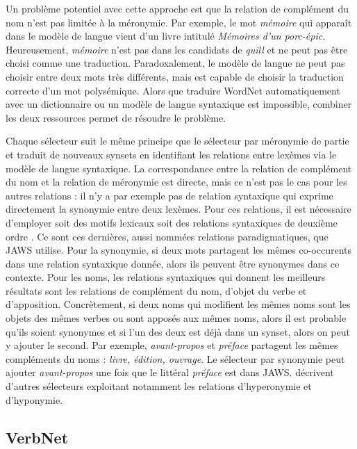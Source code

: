 Un problème potentiel avec cette approche est que la relation de complément du nom n'est pas limitée à la méronymie. Par exemple, le mot \textit{mémoire} qui apparaît dans le modèle de langue vient d'un livre intitulé \textit{Mémoires d'un porc-épic}. Heureusement, \textit{mémoire} n'est pas dans les candidats de \textit{quill} et ne peut pas être choisi comme une traduction. Paradoxalement, le modèle de langue ne peut pas choisir entre deux mots très différents, mais est capable de choisir la traduction correcte d'un mot polysémique. Alors que traduire WordNet automatiquement avec un dictionnaire ou un modèle de langue syntaxique est impossible, combiner les deux ressources permet de résoudre le problème.

Chaque sélecteur suit le même principe que le sélecteur par méronymie de partie et traduit de nouveaux synsets en identifiant les relations entre lexèmes via le modèle de langue syntaxique. La correspondance entre la relation de complément du nom et la relation de méronymie est directe, mais ce n'est pas le cas pour les autres relations : il n'y a par exemple pas de relation syntaxique qui exprime directement la synonymie entre deux lexèmes. Pour ces relations, il est nécessaire d'employer soit des motifs lexicaux \citep{hearst1992automatic} soit des relations syntaxiques de deuxième ordre \citep{lenci2012identifying}. Ce sont ces dernières, aussi nommées relations paradigmatiques, que JAWS utilise. Pour la synonymie, si deux mots partagent les mêmes co-occurents dans une relation syntaxique donnée, alors ils peuvent être synonymes dans ce contexte. Pour les noms, les relations syntaxiques qui donnent les meilleurs résultats sont les relations de complément du nom, d'objet du verbe et d'apposition. Concrètement, si deux noms qui modifient les mêmes noms sont les objets des mêmes verbes ou sont apposés aux mêmes noms, alors il est probable qu'ils soient synonymes et si l'un des deux est déjà dans un synset, alors on peut y ajouter le second. Par exemple, \textit{avant-propos} et \textit{préface} partagent les mêmes compléments du noms : \textit{livre, édition, ouvrage}. Le sélecteur par synonymie peut ajouter \textit{avant-propos} une fois que le littéral \textit{préface} est dans JAWS. \citep{mouton2010jaws,mouton2010phd} décrivent d'autres sélecteurs exploitant notamment les relations d'hyperonymie et d'hyponymie.


\subsection{VerbNet}

